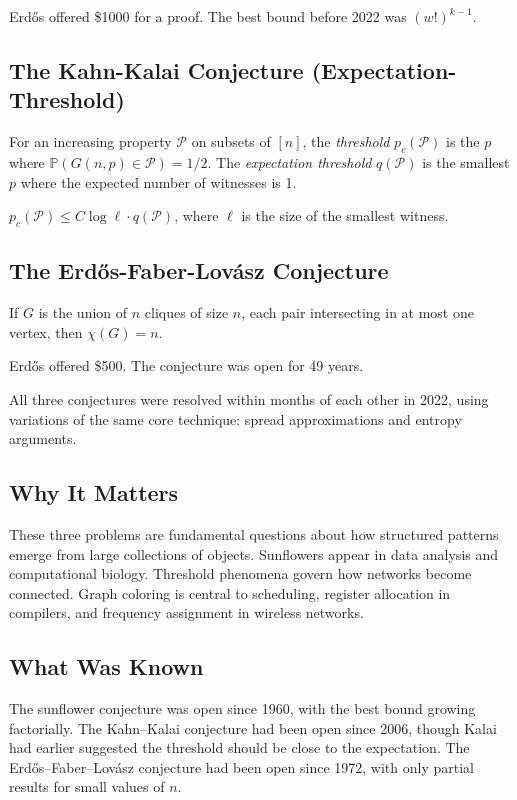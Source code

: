 Erd\H{o}s offered \$1000 for a proof. The best bound before 2022 was $(w!)^{k-1}$.

\subsection{The Kahn-Kalai Conjecture (Expectation-Threshold)}
For an increasing property $\mathcal{P}$ on subsets of $[n]$, the \emph{threshold} $p_c(\mathcal{P})$ is the $p$ where $\mathbb{P}(G(n,p) \in \mathcal{P}) = 1/2$. The \emph{expectation threshold} $q(\mathcal{P})$ is the smallest $p$ where the expected number of witnesses is 1.

\begin{conjecture}
$p_c(\mathcal{P}) \le C \log \ell \cdot q(\mathcal{P})$, where $\ell$ is the size of the smallest witness.
\end{conjecture}

\subsection{The Erd\H{o}s-Faber-Lov\'{a}sz Conjecture}

\begin{conjecture}
If $G$ is the union of $n$ cliques of size $n$, each pair intersecting in at most one vertex, then $\chi(G) = n$.
\end{conjecture}

Erd\H{o}s offered \$500. The conjecture was open for 49 years.

\begin{historicalbox}
All three conjectures were resolved within months of each other in 2022, using variations of the same core technique: spread approximations and entropy arguments.
\end{historicalbox}

\subsection{Why It Matters}
These three problems are fundamental questions about how structured patterns emerge from large collections of objects. Sunflowers appear in data analysis and computational biology. Threshold phenomena govern how networks become connected. Graph coloring is central to scheduling, register allocation in compilers, and frequency assignment in wireless networks.

\subsection{What Was Known}
The sunflower conjecture was open since 1960, with the best bound growing factorially. The Kahn--Kalai conjecture had been open since 2006, though Kalai had earlier suggested the threshold should be close to the expectation. The Erd\H{o}s--Faber--Lov\'{a}sz conjecture had been open since 1972, with only partial results for small values of $n$.

